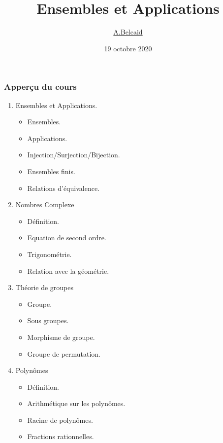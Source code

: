 \documentclass{beamer}
\title{Ensembles et Applications}
\author{\underline{A.Belcaid}}
\institute{\small École Nationale des Sciences Appliqués.}
\date{19 octobre 2020}
\begin{document}
\maketitle

\begin{frame}[t]
  \frametitle{Apperçu du cours}
  \begin{enumerate}
    \item Ensembles et Applications.
      \begin{itemize}
        \scriptsize
        \item Ensembles.
        \item Applications.
        \item Injection/Surjection/Bijection.
        \item Ensembles finis.
        \item Relations d'équivalence.
      \end{itemize}
    \item Nombres Complexe
      \begin{itemize}
        \scriptsize
        \item Définition.
        \item Equation de second ordre.
        \item Trigonométrie.
        \item Relation avec la géométrie.
      \end{itemize}
    \item Théorie de groupes
      \begin{itemize}
        \scriptsize
        \item Groupe.
        \item Sous groupes.
        \item Morphisme de groupe.
        \item Groupe de permutation.
      \end{itemize}
    \item Polynômes
      \begin{itemize}
        \scriptsize
        \item Définition.
        \item Arithmétique sur les polynômes.
        \item Racine de polynômes.
        \item Fractions rationnelles.
      \end{itemize}
  \end{enumerate} 
\end{frame}
\end{document}
